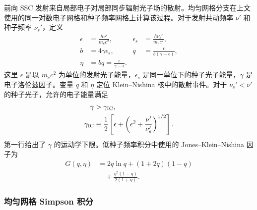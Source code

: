 \documentclass[twocolumn]{aastex702}
\begin{document}
前向 SSC 发射来自局部电子对局部同步辐射光子场的散射。均匀网格分支在上文使用的同一对数电子网格和种子频率网格上计算该过程。对于发射共动频率 \(\nu'\) 和种子频率 \(\nu_s'\)，定义
\begin{equation}
\begin{aligned}
\epsilon&=\frac{h\nu'}{m_ec^2},&
\epsilon_s&=\frac{h\nu_s'}{m_ec^2},\\
b&=4\gamma\epsilon_s,&
q&=\frac{\epsilon}{b(\gamma-\epsilon)},\\
\eta&=bq=\frac{\epsilon}{\gamma-\epsilon}.
\end{aligned}
\end{equation}
这里 \(\epsilon\) 是以 \(m_ec^2\) 为单位的发射光子能量，\(\epsilon_s\) 是同一单位下的种子光子能量，\(\gamma\) 是电子洛伦兹因子。变量 \(q\) 和 \(\eta\) 定位 Klein--Nishina 核中的散射事件。对于 \(\nu_s'<\nu'\) 的种子光子，允许的电子能量满足
\begin{equation}
\begin{aligned}
\gamma&>\gamma_{\rm IC},\\
\gamma_{\rm IC}
&\equiv
\frac{1}{2}\left[\epsilon+
\left(\epsilon^2+\frac{\nu'}{\nu_s'}\right)^{1/2}\right].
\end{aligned}
\end{equation}
第一行给出了 \(\gamma\) 的运动学下限。低种子频率积分中使用的 Jones--Klein--Nishina 因子为
\begin{equation}
\begin{aligned}
G(q,\eta)
&=2q\ln q+(1+2q)(1-q)\\
&\quad+\frac{\eta^2(1-q)}{2(1+\eta)} .
\end{aligned}
\label{eq:ssc-kernel}
\end{equation}

\subsubsection{均匀网格 Simpson 积分}
\end{document}
